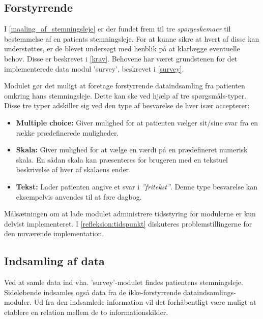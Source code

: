 \subsection{Forstyrrende}
I \cref{maaling_af_stemningsleje} er der fundet frem til tre \textit{spørgeskemaer} til bestemmelse af en patients stemningsleje.
For at kunne sikre at hvert af disse kan understøttes, er de blevet undersøgt med henblik på at klarlægge eventuelle behov.
Disse er beskrevet i \cref{krav}.
Behovene har været grundstenen for det implementerede data modul 'survey', beskrevet i \cref{survey}.

Modulet gør det muligt at foretage forstyrrende dataindsamling fra patienten omkring hans stemningsleje.
Dette kan ske ved hjælp af tre spørgsmåls-typer.
Disse tre typer adskiller sig ved den type af besvarelse de hver især accepterer:
\begin{itemize}
\item \textbf{Multiple choice:} Giver mulighed for at patienten vælger sit/sine svar fra en række prædefinerede muligheder.
\item \textbf{Skala:} Giver mulighed for at vælge en værdi på en prædefineret numerisk skala.
En sådan skala kan præsenteres for brugeren med en tekstuel beskrivelse af hver af skalaens ender.
\item \textbf{Tekst:} Lader patienten angive et svar i \textit{''fritekst''}.
Denne type besvarelse kan eksempelvis anvendes til at føre dagbog.
\end{itemize}
Målsætningen om at lade modulet administrere tidsstyring for modulerne er kun delvist implementeret.
I \cref{refleksion:tidspunkt} diskuteres problemstillingerne for den nuværende implementation.

\subsection{Indsamling af data}
Ved at samle data ind vha. 'survey'-modulet findes patientens stemningsleje.
Sideløbende indsamles også data fra de ikke-forstyrrende dataindsamlings-moduler.
Ud fra den indsamlede information vil det forhåbentligt være muligt at etablere en relation mellem de to informationskilder.

